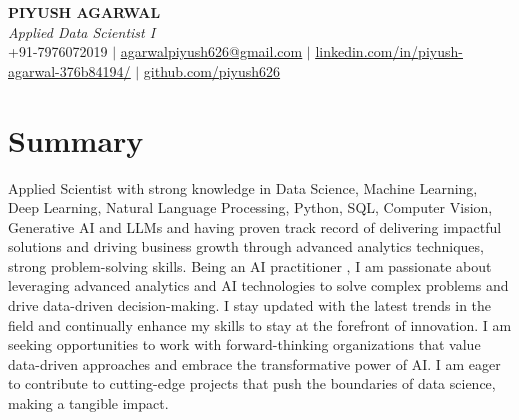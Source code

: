 \documentclass[letterpaper,11pt]{article}
\begin{document}

\begin{center}
    \textbf{\Huge \scshape PIYUSH AGARWAL} \\ \vspace{1pt}
    \small \textit{Applied Data Scientist I} \\
    +91-7976072019 $|$ \href{mailto:namesurname@gmail.com}{\underline{agarwalpiyush626@gmail.com}} $|$ 
    \href{https://www.linkedin.com/in/namesurname/}{\underline{linkedin.com/in/\href{https://www.linkedin.com/in/piyush-\%20\%20\%20\%20\%20\%20agarwal-376b84194}{piyush-agarwal-376b84194}/}} $|$
    \href{https://github.com/namesurname}{\underline{github.com/piyush626}}
\end{center}

\section*{Summary}
Applied Scientist with strong knowledge in Data Science, Machine Learning, Deep Learning, Natural Language Processing, Python, SQL, Computer Vision, Generative AI and LLMs and having proven track record of delivering impactful solutions and driving business growth through advanced analytics techniques, strong problem-solving skills. Being an AI practitioner , I am passionate about leveraging advanced analytics and AI technologies to solve complex problems and drive data-driven decision-making. I stay updated with the latest trends in the field and continually enhance my skills to stay at the forefront of innovation. I am seeking opportunities to work with forward-thinking organizations that value data-driven approaches and embrace the transformative power of AI. I am eager to contribute to cutting-edge projects that push the boundaries of data science, making a tangible impact. 

\end{document}

